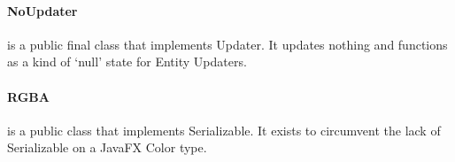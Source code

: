 \paragraph{NoUpdater} is a public final class that implements Updater. It updates nothing and functions as a kind of `null' state for Entity Updaters.

\paragraph{RGBA} is a public class that implements Serializable. It exists to circumvent the lack of Serializable on a JavaFX Color type.

